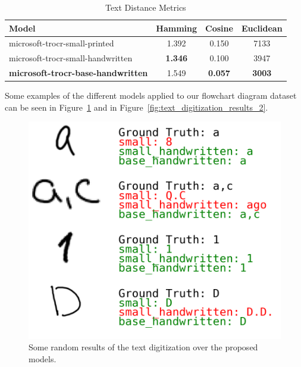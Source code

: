 \documentclass[conference]{IEEEtran}
\begin{document}
\begin{table}[htbp]
\caption{Text Distance Metrics}
\centering
\begin{tabular}{lccc}
\hline
\textbf{Model} & \textbf{Hamming} & \textbf{Cosine} & \textbf{Euclidean} \\
\hline
microsoft-trocr-small-printed & 1.392 & 0.150 & 7133 \\
microsoft-trocr-small-handwritten & \textbf{1.346} & 0.100  & 3947 \\ 
\hline 
\textbf{microsoft-trocr-base-handwritten} & 1.549 & \textbf{0.057} & \textbf{3003} \\
\hline
\end{tabular}
\label{tab:text_digitization}
\end{table}

Some examples of the different models applied to our flowchart diagram dataset can be seen in Figure~\ref{fig:text_digitization_results_1} and in Figure~\ref{fig:text_digitization_results_2}.

\begin{figure}[H]
\centering
\includegraphics[width=\linewidth]{text_digitization_results_1.png}
\caption{Some random results of the text digitization over the proposed models.}
\label{fig:text_digitization_results_1}
\end{figure}
\end{document}
